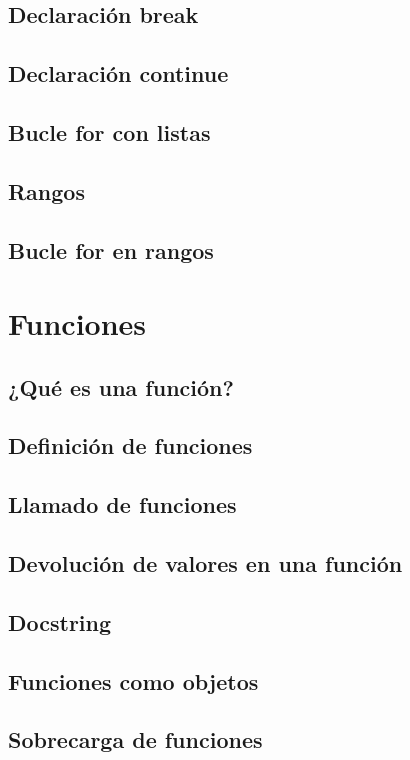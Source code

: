 \documentclass{article}
\begin{document}
      \subsection{Declaración break}
      \subsection{Declaración continue}
      \subsection{Bucle for con listas}
      \subsection{Rangos}
      \subsection{Bucle for en rangos}
    
    \section{Funciones}

      \subsection{¿Qué es una función?}
      \subsection{Definición de funciones}
      \subsection{Llamado de funciones}
      \subsection{Devolución de valores en una función}
      \subsection{Docstring}
      \subsection{Funciones como objetos}
      \subsection{Sobrecarga de funciones}
\end{document}
